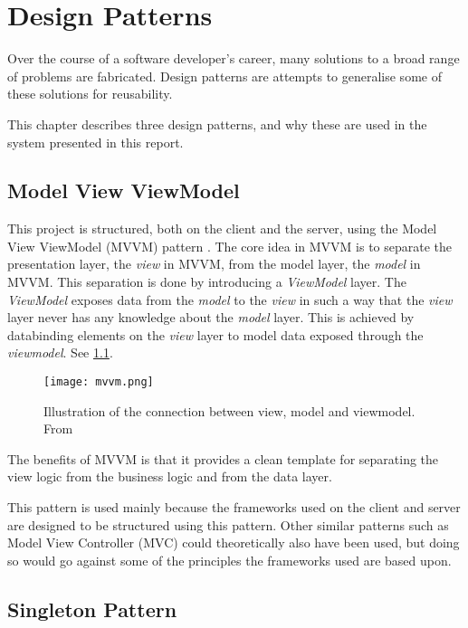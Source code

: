 \chapter{Design Patterns}

Over the course of a software developer's career, many solutions to a broad range of
problems are fabricated. Design patterns are attempts to generalise some of these solutions
for reusability.

This chapter describes three design patterns, and why these are used
in the system presented in this report.

\section{Model View ViewModel}

This project is structured, both on the client and the server, using
the Model View ViewModel (MVVM) pattern \cite{mvvm}. The core idea in MVVM is to
separate the presentation layer, the \textit{view} in MVVM, from the model
layer, the \textit{model} in MVVM. This separation is done by introducing a
\textit{ViewModel} layer. The \textit{ViewModel} exposes data from the \textit{model} to the \textit{view}
in such a way that the \textit{view} layer never has any knowledge about the
\textit{model} layer. This is achieved by databinding elements on the \textit{view}
layer to model data exposed through the \textit{viewmodel}. See \cref{fig:mvvm}.

\begin{figure}
  \centering
  \texttt{[image: mvvm.png]}
  \caption{Illustration of the connection between view, model and
    viewmodel. From \cite{mvvm}}\label{fig:mvvm}
\end{figure}

The benefits of MVVM is that it provides a clean template for
separating the view logic from the business logic and from the data
layer.

This pattern is used mainly because the frameworks used on the client
and server are designed to be structured using this pattern. Other
similar patterns such as Model View Controller (MVC) could
theoretically also have been used, but doing so would go against some
of the principles the frameworks used are based upon.

\section{Singleton Pattern}

